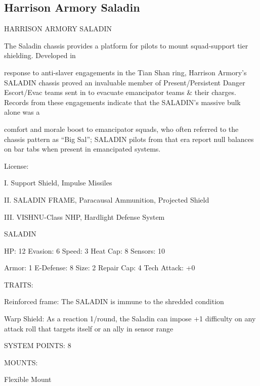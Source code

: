 \subsection{Harrison Armory Saladin}

                                HARRISON ARMORY SALADIN  

The Saladin chassis provides a platform for pilots to mount squad-support tier shielding. Developed in  

response to anti-slaver engagements in the Tian Shan ring, Harrison Armory’s SALADIN chassis proved an  
invaluable member of Present/Persistent Danger Escort/Evac teams sent in to evacuate emancipator teams  
\& their charges. Records from these engagements indicate that the SALADIN’s massive bulk alone was a  

comfort and morale boost to emancipator squads, who often referred to the chassis pattern as “Big Sal”;  
SALADIN pilots from that era report null balances on bar tabs when present in emancipated systems.   

                                                   License:
 
I. Support Shield, Impulse Missiles
 
II. SALADIN FRAME, Paracausal Ammunition, Projected Shield
 
III. VISHNU-Class NHP, Hardlight Defense System
 

                                                 SALADIN 

 HP: 12         Evasion: 6                            Speed: 3            Heat Cap: 8        Sensors: 10 

 Armor: 1       E-Defense: 8                          Size: 2             Repair Cap: 4      Tech Attack:  
                                                                                             +0 

                                                   TRAITS: 

 Reinforced frame: The SALADIN is immune to the shredded condition
 
 Warp Shield: As a reaction 1/round, the Saladin can impose +1 difficulty on any attack roll that targets  
 itself or an ally in sensor range  

                                             SYSTEM POINTS: 8 

                                                  MOUNTS: 

 Flexible Mount 

